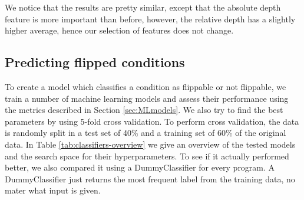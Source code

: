 We notice that the results are pretty similar, except that the absolute depth feature is more important than before, however, the relative depth has a slightly higher average, hence our selection of features does not change.

\subsection{Predicting flipped conditions}
To create a model which classifies a condition as flippable or not flippable, we train a number of machine learning models and assess their performance using the metrics described in Section \ref{sec:MLmodels}. We also try to find the best parameters by using 5-fold cross validation. To perform cross validation, the data is randomly split in a test set of 40\% and a training set of 60\% of the original data.
In Table \ref{tab:classifiers-overview} we give an overview of the tested models and the search space for their hyperparameters.
To see if it actually performed better, we also compared it using a DummyClassifier for every program. A DummyClassifier just returns the most frequent label from the training data, no mater what input is given.

